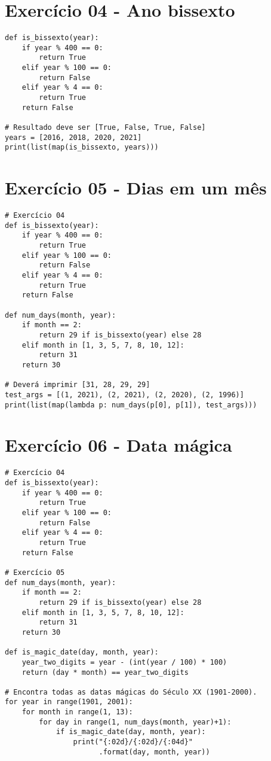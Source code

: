 \documentclass[article, a4paper, oneside, 11pt, english, brazil, sumario=tradicional]{abntex2}
\begin{document}
\section{Exercício 04 - Ano bissexto}
\label{sec:orgdda02d4}

\begin{verbatim}
def is_bissexto(year):
    if year % 400 == 0:
        return True
    elif year % 100 == 0:
        return False
    elif year % 4 == 0:
        return True
    return False

# Resultado deve ser [True, False, True, False]
years = [2016, 2018, 2020, 2021]
print(list(map(is_bissexto, years)))
\end{verbatim}

\section{Exercício 05 - Dias em um mês}
\label{sec:orgc43fa98}

\begin{verbatim}
# Exercício 04
def is_bissexto(year):
    if year % 400 == 0:
        return True
    elif year % 100 == 0:
        return False
    elif year % 4 == 0:
        return True
    return False

def num_days(month, year):
    if month == 2:
        return 29 if is_bissexto(year) else 28
    elif month in [1, 3, 5, 7, 8, 10, 12]:
        return 31
    return 30

# Deverá imprimir [31, 28, 29, 29]
test_args = [(1, 2021), (2, 2021), (2, 2020), (2, 1996)]
print(list(map(lambda p: num_days(p[0], p[1]), test_args)))
\end{verbatim}

\newpage
\section{Exercício 06 - Data mágica}
\label{sec:org2533c67}

\begin{verbatim}
# Exercício 04
def is_bissexto(year):
    if year % 400 == 0:
        return True
    elif year % 100 == 0:
        return False
    elif year % 4 == 0:
        return True
    return False

# Exercício 05
def num_days(month, year):
    if month == 2:
        return 29 if is_bissexto(year) else 28
    elif month in [1, 3, 5, 7, 8, 10, 12]:
        return 31
    return 30

def is_magic_date(day, month, year):
    year_two_digits = year - (int(year / 100) * 100)
    return (day * month) == year_two_digits

# Encontra todas as datas mágicas do Século XX (1901-2000).
for year in range(1901, 2001):
    for month in range(1, 13):
        for day in range(1, num_days(month, year)+1):
            if is_magic_date(day, month, year):
                print("{:02d}/{:02d}/{:04d}"
                      .format(day, month, year))
\end{verbatim}
\end{document}
